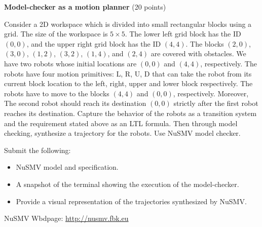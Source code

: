 \documentclass[a4paper, 12pt]{article}
\begin{document}
\begin{problem} {\textbf{Model-checker as a motion planner}} (20 points)

\bigskip
Consider a 2D workspace which
is divided into small rectangular blocks using a grid. The size of the workspace is $5 \times 5$. The lower left grid block has the ID $(0,0)$, and 
the upper right grid block has the ID $(4,4)$. The blocks $(2,0)$, $(3,0)$, $(1,2)$, $(3,2)$, $(1,4)$, and $(2,4)$ are covered with obstacles.
We have two robots whose initial locations are $(0,0)$ and $(4,4)$, respectively. 
The robots have four motion primitives: L, R, U, D that can take the robot from its current block location to the left, right, upper and lower block respectively.  
The robots have to move to the blocks $(4,4)$ and $(0,0)$, respectively. Moreover, The second robot should reach its destination $(0,0)$ strictly after the first robot  reaches its destination.
Capture the behavior of the robots as a transition system and the requirement stated above as an LTL formula. 
Then through model checking, synthesize a trajectory for the robots. Use NuSMV model checker.

\medskip
\noindent
Submit the following:
\begin{itemize}
\item NuSMV model and specification.
\item A snapshot of the terminal showing the execution of the model-checker.
\item Provide a visual representation of the trajectories synthesized by NuSMV.
\end{itemize}

\medskip
\noindent
NuSMV Wbdpage:
\url{http://nusmv.fbk.eu}

\newpage
\ \\
\begin{minipage}{1\textwidth}
		\rectangle{\linewidth}{24cm}
\end{minipage}
\newpage
\ \\
\begin{minipage}{1\textwidth}
		\rectangle{\linewidth}{24cm}
\end{minipage}
\newpage
\ \\
\begin{minipage}{1\textwidth}
		\rectangle{\linewidth}{24cm}
\end{minipage}
\newpage
\ \\
\begin{minipage}{1\textwidth}
		\rectangle{\linewidth}{24cm}
\end{minipage}
\newpage
\ \\
\begin{minipage}{1\textwidth}
		\rectangle{\linewidth}{24cm}
\end{minipage}
\newpage
\ \\
\begin{minipage}{1\textwidth}
		\rectangle{\linewidth}{24cm}
\end{minipage}
\end{problem}
\end{document}
